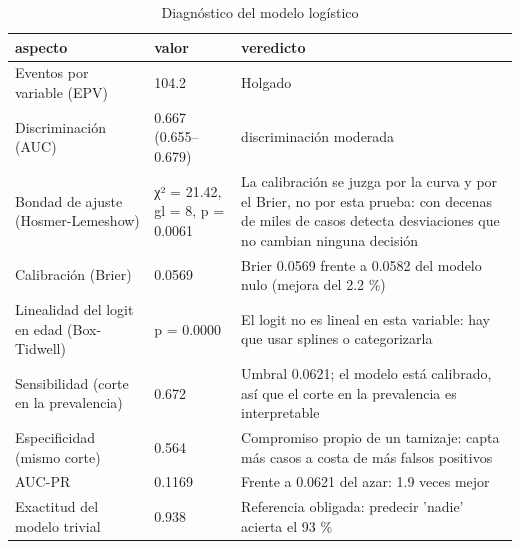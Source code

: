 \begin{table}[htbp]
\caption{Diagnóstico del modelo logístico}
\label{tab:tabla_24_diagnostico_logistica}
\begin{tabular}{lll}
\toprule
aspecto & valor & veredicto \\
\midrule
Eventos por variable (EPV) & 104.2 & Holgado \\
Discriminación (AUC) & 0.667 (0.655–0.679) & discriminación moderada \\
Bondad de ajuste (Hosmer-Lemeshow) & χ² = 21.42, gl = 8, p = 0.0061 & La calibración se juzga por la curva y por el Brier, no por esta prueba: con decenas de miles de casos detecta desviaciones que no cambian ninguna decisión \\
Calibración (Brier) & 0.0569 & Brier 0.0569 frente a 0.0582 del modelo nulo (mejora del 2.2 \%) \\
Linealidad del logit en edad (Box-Tidwell) & p = 0.0000 & El logit no es lineal en esta variable: hay que usar splines o categorizarla \\
Sensibilidad (corte en la prevalencia) & 0.672 & Umbral 0.0621; el modelo está calibrado, así que el corte en la prevalencia es interpretable \\
Especificidad (mismo corte) & 0.564 & Compromiso propio de un tamizaje: capta más casos a costa de más falsos positivos \\
AUC-PR & 0.1169 & Frente a 0.0621 del azar: 1.9 veces mejor \\
Exactitud del modelo trivial & 0.938 & Referencia obligada: predecir 'nadie' acierta el 93 \% \\
\bottomrule
\end{tabular}
\end{table}
